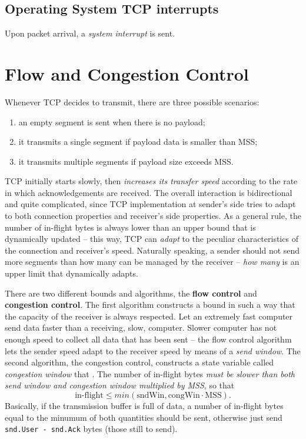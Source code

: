 \documentclass[a4paper, 11pt]{report}
\begin{document}
\section{Operating System TCP interrupts}

Upon packet arrival, a \emph{system interrupt} is sent. 

\chapter{Flow and Congestion Control}

Whenever TCP decides to transmit, there are three possible scenarios: 
\begin{enumerate}
	\item an empty segment is sent when there is no payload;
	\item it transmits a single segment if payload data is smaller than MSS;
	\item it transmits multiple segments if payload size exceeds MSS.
\end{enumerate}

TCP initially starts slowly, then \emph{increases its transfer speed} according
to the rate in which acknowledgements are received. The overall interaction is
bidirectional and quite complicated, since TCP implementation at sender's side
tries to adapt to both connection properties and receiver's side properties.
As a general rule, the number of in-flight bytes is always lower than an upper
bound that is dynamically updated \--- this way, TCP can \emph{adapt} to the
peculiar characteristics of the connection and receiver's speed. Naturally
speaking, a sender should not send more segments than how many can be managed
by the receiver \--- \emph{how many} is an upper limit that dynamically adapts.

There are two different bounds and algorithms, the \textbf{flow control} and
\textbf{congestion control}. The first algorithm constructs a bound in such a
way that the capacity of the receiver is always respected. Let an extremely
fast computer send data faster than a receiving, slow, computer. Slower
computer has not enough speed to collect all data that has been sent \--- the
flow control algorithm lets the sender speed adapt to the receiver speed by
means of a \emph{send window}. The second algorithm, the congestion control,
constructs a state variable called \emph{congestion window} that . The number
of in-flight bytes \emph{must be slower than both send window and congestion
window multiplied by MSS}, so that $$\mbox{in-flight} \leq min(\mbox{sndWin},
\mbox{congWin} \cdot \mbox{MSS}).$$ Basically, if the transmission buffer is full of data,
a number of in-flight bytes equal to the minumum of both quantities should be
sent, otherwise just send \texttt{snd.User - snd.Ack} bytes (those still to
send).
\end{document}

